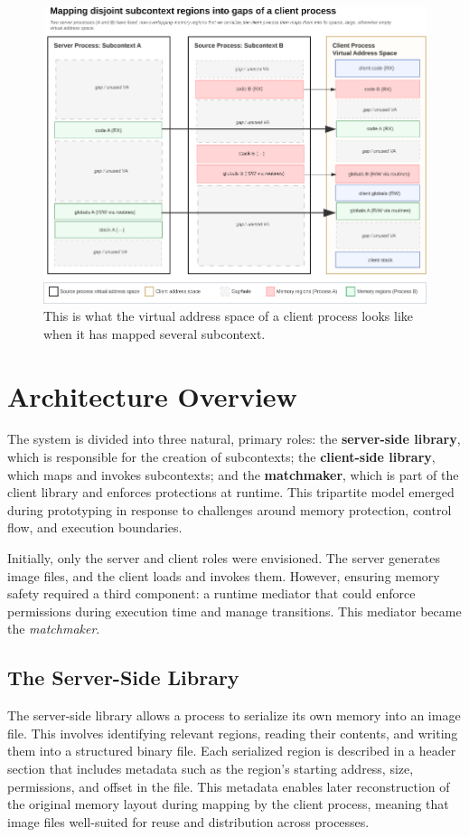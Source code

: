 \begin{figure}[ht]
    \centering
    \includegraphics[width=\textwidth]{subcontexts_slotting_into_client.png}
    \caption{This is what the virtual address space of a client process looks like when it has mapped several subcontext.}
\end{figure}

\newpage
\section*{Architecture Overview}
The system is divided into three natural, primary roles: the \textbf{server-side library}, which is responsible for the creation of subcontexts; the 
\textbf{client-side library}, which maps and invokes subcontexts; and the \textbf{matchmaker}, which is part of the client library and enforces protections at runtime. This tripartite model emerged during prototyping in response to challenges around memory protection, control flow, and execution boundaries.

Initially, only the server and client roles were envisioned. The server generates image files, and the client loads and invokes them. However, ensuring memory safety required a third component: a runtime mediator that could enforce permissions during execution time and manage transitions. This mediator became the \textit{matchmaker}.

\subsection*{The Server-Side Library}
The server-side library allows a process to serialize its own memory into an image file. This involves identifying relevant regions, reading their contents, and writing them into a structured binary file. Each serialized region is described in a header section that includes metadata such as the region’s starting address, size, permissions, and offset in the file. This metadata enables later reconstruction of the original memory layout during mapping by the client process, meaning that image files well-suited for reuse and distribution across processes.


